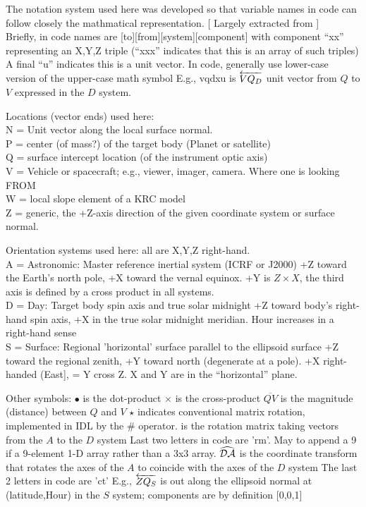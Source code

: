 \documentclass{article}
\begin{document}
 The notation system used here was developed so that variable names in code can
 follow closely the mathmatical representation.  [ Largely extracted from  ]  
\\ Briefly, in code names are [to][from][system][component] with component ``xx'' representing an X,Y,Z triple (``xxx'' indicates that this is an array of such triples)
\qi A final ``u'' indicates this is a unit vector. 
\qi In code, generally use lower-case version of the upper-case math symbol
\qi E.g., vqdxu is $\overleftarrow{VQ_D}$ unit vector from $Q$ to $V$ expressed in the $D$ system.

\vspace{2.mm}
Locations (vector ends) used here:
\\ N = Unit vector along the local surface normal.
\\ P = center (of mass?) of the target body (Planet or satellite)
\\ Q = surface intercept location (of the instrument optic axis)
\\ V = Vehicle or spacecraft; e.g., viewer, imager, camera. Where one is looking FROM
\\ W = local slope element of a KRC model
\\ Z = generic, the +Z-axis direction of the given coordinate system or surface normal.
 
\vspace{2.mm}
Orientation systems used here: all are X,Y,Z right-hand. 
\\ A = Astronomic: Master reference inertial system (ICRF or J2000)
\qi  +Z toward the Earth's north pole, +X toward the vernal equinox.
\qii +Y is $Z \times  X $, the third axis is defined by a cross product in all systems. 
\\ D = Day:        Target body spin axis and true solar midnight
\qi +Z toward body's right-hand spin axis, +X in the true solar midnight meridian.
\qii Hour increases in a right-hand sense
\\ S = Surface:    Regional 'horizontal' surface parallel to the ellipsoid surface
\qi  +Z toward the regional zenith, +Y toward north (degenerate at a pole).
\qii  +X right-handed (East], = Y cross Z. X and Y are in the ``horizontal'' plane.

\vspace{2.mm}
Other symbols:
\qi $\bullet$ is the dot-product 
\qi $\times$ is the cross-product 
\qi $\overline{QV}$ is the magnitude (distance) between $Q$ and $V$
\qi $\star$ indicates conventional matrix rotation, implemented in IDL by the \#
 operator.
\qi {} is the rotation matrix taking vectors from the $A$ to the $D$ system
\qii Last two letters in code are 'rm'. May to append a 9 if a 9-element 1-D array rather than a 3x3 array.
\qi  $\widehat {\mathcal{DA}}$ is the coordinate transform that rotates the axes of the $A$ to 
coincide with the axes of the $D$ system
\qii  The last 2 letters in code are 'ct'
\qi E.g., $\overleftarrow{ZQ_S}$ is out along the ellipsoid normal at (latitude,Hour) in the $S$ system;  components are by definition [0,0,1] 
\end{document}
